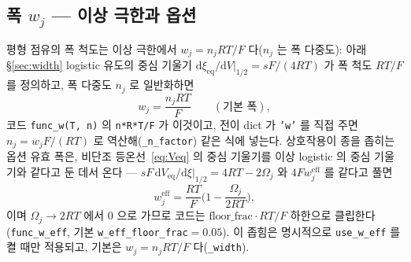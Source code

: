 \documentclass[11pt,a4paper]{article}
\newcommand{\dd}{\mathrm{d}}
\newcommand{\eff}{\mathrm{eff}}
\newcommand{\eq}{\mathrm{eq}}
\newcommand{\code}[1]{\texttt{#1}}
\begin{document}
\subsection{폭 $w_j$ — 이상 극한과 옵션}
평형 점유의 폭 척도는 이상 극한에서 $w_j=n_jRT/F$ 다($n_j$ 는 폭 다중도): 아래 \S\ref{sec:width} logistic 유도의
중심 기울기 $\dd\xi_\eq/\dd V|_{1/2}=sF/(4RT)$ 가 폭 척도 $RT/F$ 를 정의하고, 폭 다중도 $n_j$ 로 일반화하면
\begin{equation}
w_j=\frac{n_jRT}{F}\qquad(\text{기본 폭}),
\label{eq:wbase}
\end{equation}
코드 \code{func\_w(T, n)} 의 \code{n*R*T/F}
가 이것이고, 전이 dict 가 \code{'w'} 를 직접 주면 $n_j=w_jF/(RT)$ 로 역산해(\code{\_n\_factor}) 같은 식에 넣는다.
상호작용이 종을 좁히는 옵션 유효 폭은, 비단조 등온선~\eqref{eq:Veq} 의 중심 기울기를 이상 logistic 의 중심 기울기와
같다고 둔 데서 온다 — $sF\,\dd V_\eq/\dd\xi|_{1/2}=4RT-2\Omega_j$ 와 $4Fw^\eff_j$ 를 같다고 풀면
\begin{equation}
w_j^\eff=\frac{RT}{F}\Big(1-\frac{\Omega_j}{2RT}\Big),
\label{eq:weff}
\end{equation}
이며 $\Omega_j\to2RT$ 에서 $0$ 으로 가므로 코드는 $\mathrm{floor\_frac}\cdot RT/F$ 하한으로 클립한다(\code{func\_w\_eff},
기본 \code{w\_eff\_floor\_frac}$=0.05$). 이 좁힘은 명시적으로 \code{use\_w\_eff} 를 켤 때만 적용되고, 기본은
$w_j=n_jRT/F$ 다(\code{\_width}).
\end{document}
